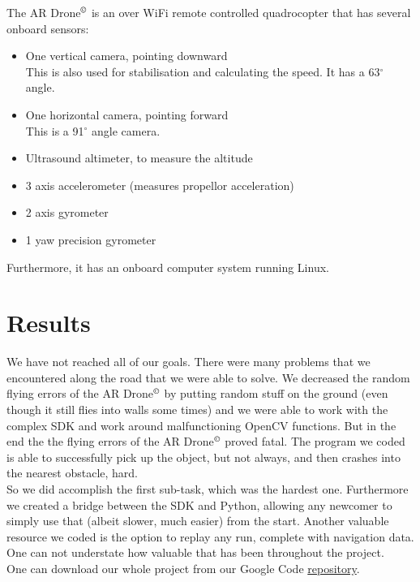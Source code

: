 \documentclass[a4paper,10pt]{article}
\newcommand{\Ardrone}{AR Drone$^{\copyright}$ }
\begin{document}
The \Ardrone is an over WiFi remote controlled quadrocopter that has several onboard sensors:
\begin{itemize}
	\item One vertical camera, pointing downward \\ This is also used for stabilisation and calculating the speed. It has a 63$^{\circ}$ angle.
	\item One horizontal camera, pointing forward \\ This is a 91$^{\circ}$ angle camera.
	\item Ultrasound altimeter, to measure the altitude
    \item 3 axis accelerometer (measures propellor acceleration)
    \item 2 axis gyrometer 
    \item 1 yaw precision gyrometer
\end{itemize}
Furthermore, it has an onboard computer system running Linux. 





\section{Results}
We have not reached all of our goals. There were many problems that we encountered along the road that we were able to solve. We decreased the random flying errors
of the \Ardrone by putting random stuff on the ground (even though it still
flies into walls some times) and we were able to work with the complex SDK and work around
malfunctioning OpenCV functions. But in the end the the flying errors of the
\Ardrone proved fatal. The program we coded is able to successfully pick up the object,
but not always, and then crashes into the nearest obstacle, hard. \\

So we did accomplish the first sub-task, which was the hardest one. Furthermore we created a bridge between the SDK and Python, allowing any newcomer to simply use 
that (albeit slower, much easier) from the start. Another valuable resource we coded is the option to replay any run, complete with navigation data. One can not understate
how valuable that has been throughout the project. \\

One can download our whole project from our Google Code \href{http://code.google.com/p/uvhar/}{repository}.
\end{document}
